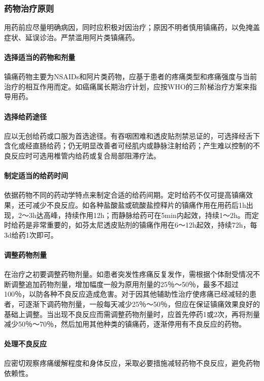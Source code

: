\subsubsection{药物治疗原则}

用药前应尽量明确病因，同时应积极对因治疗；原因不明者慎用镇痛药，以免掩盖症状、延误诊治。严禁滥用阿片类镇痛药。
\paragraph{选择适当的药物和剂量}

镇痛药物主要为NSAIDs和阿片类药物，应基于患者的疼痛类型和疼痛强度与当前治疗的相互作用而定。如癌痛属长期治疗计划，应按WHO的三阶梯治疗方案来指导用药。
\paragraph{选择给药途径}

应以无创给药或口服为首选途径。有吞咽困难和透皮贴剂禁忌证的，可选择经舌下含化或经直肠给药；仍无明显改善者可经肌内或静脉注射给药；产生难以控制的不良反应时可选用椎管内给药或复合局部阻滞疗法。
\paragraph{制定适当的给药时间}

依据药物不同的药动学特点来制定合适的给药间期。定时给药不仅可提高镇痛效果，还可减少不良反应。如各种盐酸盐或硫酸盐控释片的镇痛作用在用药后1h出现，2～3h达高峰，持续作用12h；而静脉给药可在5min内起效，持续1～2h。而定时给药是非常重要的，如芬太尼透皮贴剂的镇痛作用在6～12h起效，持续72h，每3d给药1次即可。
\paragraph{调整药物剂量}

在治疗之初要调整药物剂量。如患者突发性疼痛反复发作，需根据个体耐受情况不断调整追加药物剂量，增加幅度一般为原用剂量的25％～50％，最多不超过100％，以防各种不良反应造成危害。对于因其他辅助性治疗使疼痛已经减轻的患者，可逐渐下调药物剂量，一般每天减少25％～50％，但应在保证镇痛效果良好的基础上调整。当出现不良反应而需调整药物剂量时，应首先停药1或2次，再将剂量减少50％～70％，然后加用其他种类的镇痛药，逐渐停用有不良反应的药物。
\paragraph{处理不良反应}

应密切观察疼痛缓解程度和身体反应，采取必要措施减轻药物不良反应，避免药物依赖性。
